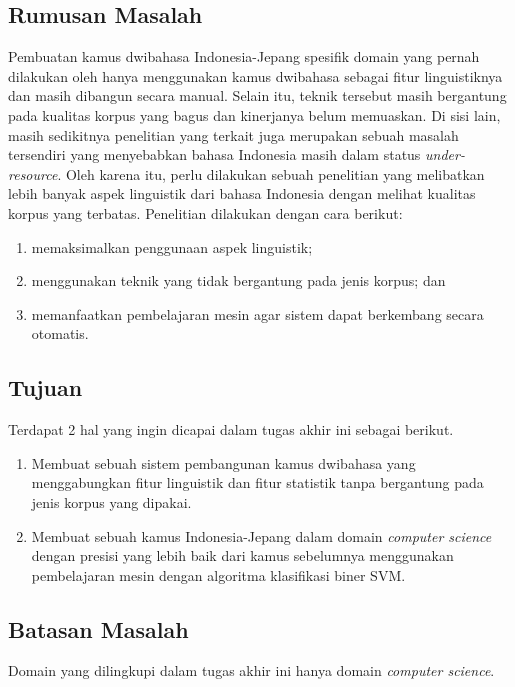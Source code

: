 \documentclass[../main/main.tex]{subfiles}
\begin{document}
\subsection{Rumusan Masalah}
\label{pendahuluan_rumusan_masalah}
Pembuatan kamus dwibahasa Indonesia-Jepang spesifik domain yang pernah dilakukan oleh \textcite{limanthie} hanya menggunakan kamus dwibahasa sebagai fitur linguistiknya dan masih dibangun secara manual. Selain itu, teknik tersebut masih bergantung pada kualitas korpus yang bagus dan kinerjanya belum memuaskan. Di sisi lain, masih sedikitnya penelitian yang terkait juga merupakan sebuah masalah tersendiri yang menyebabkan bahasa Indonesia masih dalam status \textit{under-resource}. Oleh karena itu, perlu dilakukan sebuah penelitian yang melibatkan lebih banyak aspek linguistik dari bahasa Indonesia dengan melihat kualitas korpus yang terbatas. Penelitian dilakukan dengan cara berikut:
\begin{enumerate}
\item memaksimalkan penggunaan aspek linguistik;
\item menggunakan teknik yang tidak bergantung pada jenis korpus; dan
\item memanfaatkan pembelajaran mesin agar sistem dapat berkembang secara otomatis.
\end{enumerate}

\subsection{Tujuan}
Terdapat 2 hal yang ingin dicapai dalam tugas akhir ini sebagai berikut.
\begin{enumerate}
\item Membuat sebuah sistem pembangunan kamus dwibahasa yang menggabungkan fitur linguistik dan fitur statistik tanpa bergantung pada jenis korpus yang dipakai.
\item Membuat sebuah kamus Indonesia-Jepang dalam domain \textit{computer science} dengan presisi yang lebih baik dari kamus sebelumnya menggunakan pembelajaran mesin dengan algoritma klasifikasi biner SVM.
\end{enumerate}

\subsection{Batasan Masalah}
Domain yang dilingkupi dalam tugas akhir ini hanya domain \textit{computer science}.
\end{document}
